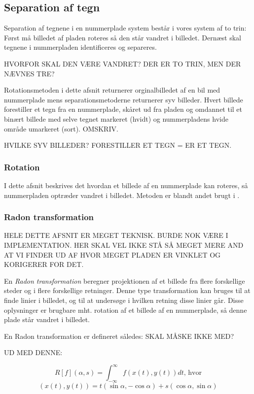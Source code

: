 \subsection{Separation af tegn}

Separation af tegnene i en nummerplade system består i vores system af to trin: Først må billedet af pladen roteres så den står vandret i billedet. Dernæst skal tegnene i nummerpladen identificeres og separeres.

HVORFOR SKAL DEN VÆRE VANDRET?
DER ER TO TRIN, MEN DER NÆVNES TRE?

Rotationsmetoden i dette afsnit returnerer orginalbilledet af en bil med nummerplade mens separationsmetoderne returnerer syv billeder. Hvert billede forestiller et tegn fra en nummerplade, skåret ud fra pladen og omdannet til et binært billede med selve tegnet markeret (hvidt) og nummerpladens hvide område umarkeret (sort). OMSKRIV.

HVILKE SYV BILLEDER? FORESTILLER ET TEGN = ER ET TEGN.

\subsubsection{Rotation}

I dette afsnit beskrives det hvordan et billede af en nummerplade kan roteres, så nummerpladen optræder vandret i billedet. Metoden er blandt andet brugt i \cite{shapiro}.

\subsubsection*{Radon transformation}
HELE DETTE AFSNIT ER MEGET TEKNISK. BURDE NOK VÆRE I IMPLEMENTATION. HER SKAL VEL IKKE STÅ SÅ MEGET MERE AND AT VI FINDER UD AF HVOR MEGET PLADEN ER VINKLET OG KORIGERER FOR DET.

En \textit{Radon transformation} beregner projektionen af et billede fra flere forskellige steder og i flere forskellige retninger\cite{matlab_radon}. Denne type transformation kan bruges til at finde linier i billedet, og til at undersøge i hvilken retning disse linier går. Disse oplysninger er brugbare mht. rotation af et billede af en nummerplade, så denne plade står vandret i billedet.

En Radon transformation er defineret således\cite{wiki_radon}: SKAL MÅSKE IKKE MED?

UD MED DENNE:

\begin{displaymath}
		R[f](\alpha,s) = \int_{-\infty}^{\infty}f(x(t),y(t))dt \text{, hvor}
\end{displaymath}
\begin{displaymath}
		(x(t),y(t)) = t(\sin\alpha, -\cos\alpha)+s(\cos\alpha,\sin\alpha)
\end{displaymath}


